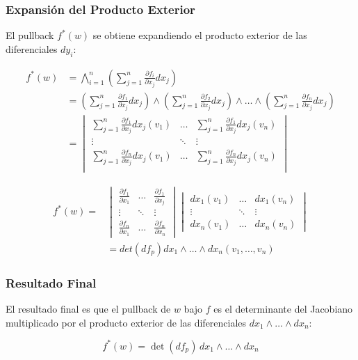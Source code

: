\documentclass{beamer}
\begin{document}
\begin{frame}
\frametitle{Expansión del Producto Exterior}
   El pullback \( f^{*}(w) \) se obtiene expandiendo el producto exterior de las diferenciales \( dy_{i} \):
   
 \begin{align*}
 f^{*}(w) &= \bigwedge_{i=1}^{n} \left( \sum_{j=1}^{n} \frac{\partial f_{i}}{\partial x_{j}} dx_{j} \right) \\
 &=\left( \sum_{j=1}^{n} \frac{\partial f_{1}}{\partial x_{j}} dx_{j} \right) \wedge \left( \sum_{j=1}^{n} \frac{\partial f_{2}}{\partial x_{j}} dx_{j} \right) \wedge \dots \wedge \left( \sum_{j=1}^{n} \frac{\partial f_{n}}{\partial x_{j}} dx_{j} \right) \\
 &= \begin{vmatrix}
    \sum_{j=1}^{n} \frac{\partial f_{1}}{\partial x_{j}} dx_{j}(v_1) & \dots & \sum_{j=1}^{n} \frac{\partial f_{1}}{\partial x_{j}} dx_{j}(v_n) \\
     \vdots& \ddots& \vdots\\
    \sum_{j=1}^{n} \frac{\partial f_{n}}{\partial x_{j}} dx_{j} (v_1) & \dots & \sum_{j=1}^{n} \frac{\partial f_{n}}{\partial x_{j}} dx_{j} (v_n)\\
    \end{vmatrix}
 \end{align*}
\end{frame}

\begin{frame}
\begin{align*}
f^{*}(w) =& \begin{vmatrix}
\frac{\partial f_{1}}{\partial x_{1}} & \dots & \frac{\partial f_{1}}{\partial x_{j}} \\
\vdots & \ddots & \vdots \\
\frac{\partial f_{n}}{\partial x_{1}} & \dots & \frac{\partial f_{n}}{\partial x_{n}}
\end{vmatrix} \begin{vmatrix}
dx_{1} (v_1) & \dots & dx_{1} (v_n) \\
\vdots & \ddots & \vdots \\
dx_{n} (v_1) & \dots & dx_{n} (v_n)
\end{vmatrix} \\
&=det(df_{p}) dx_{1} \wedge \dots \wedge dx_{n} (v_1,\dots,v_n)
\end{align*}
\end{frame}



\begin{frame}
\frametitle{Resultado Final}
   El resultado final es que el pullback de \( w \) bajo \( f \) es el determinante del Jacobiano multiplicado por el producto exterior de las diferenciales \( dx_{1} \wedge \dots \wedge dx_{n} \):

   \[ f^{*}(w) = \det(df_{p}) \, dx_{1} \wedge \dots \wedge dx_{n} \]
\end{frame}
\end{document}
